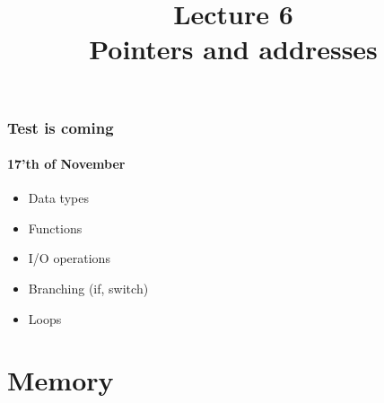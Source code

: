 \documentclass[10pt]{beamer}
\title{Lecture 6\\Pointers and addresses}
\date{}
\begin{document}
\frame{
    \titlepage
}

\begin{frame}
  \frametitle{Test is coming}
  \framesubtitle{17'th of November}
  \begin{itemize}
    \item Data types
    \item Functions
    \item I/O operations
    \item Branching (if, switch)
    \item Loops
  \end{itemize}
\end{frame}


\section{Memory}
\end{document}
